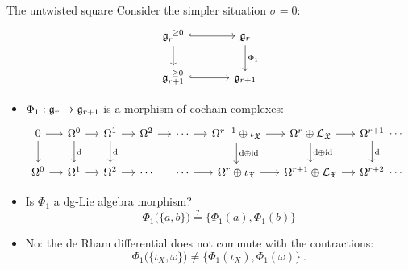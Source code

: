 \documentclass[beamer,10pt]{standalone}
\begin{document}
\begin{frame}{The untwisted square}
	Consider the simpler situation $\sigma=0$:
	\begin{displaymath}
		\begin{tikzcd}[ampersand replacement=\&, column sep = large]
			\g_{r}^{~\geq 0} \ar[r,hook] \ar[d, ]
			\& \g_{r} \ar[d,"\Phi_1"]
			\\
			\g_{r+1}^{~\geq 0} \ar[r,hook] \& \g_{r+1}
		\end{tikzcd}
	\end{displaymath}
	\vfill \pause

	\begin{itemize}[<+-|@alert@+>]
		\item $\Phi_1:\mathfrak{g}_{r}\to \mathfrak{g}_{r+1}$ is a morphism of cochain complexes:
		\begin{displaymath}
		\resizebox{\textwidth}{!}{$
		\begin{tikzcd}[ampersand replacement=\&, column sep = small]
			0\ar[r]\ar[d] \&
			\Omega^0 \ar[r] \ar[d,"\d"] \&
			\Omega^1 \ar[r] \ar[d,"\d"] \&
			\Omega^2 \ar[r] \&
			\cdots \ar[r] \&
			\Omega^{r-1}\oplus \iota_{\X} \ar[d,"\d\oplus \id"] \ar[r] \&
			\Omega^{r}\oplus \Lie_{\X} \ar[r]\ar[d,"\d\oplus\id"] \&
			\Omega^{r+1} \ar[d,"\d"] \ar[r,phantom,"\cdots"] \& \phantom{.}
			\\
			\Omega^{0} \ar[r] \&
			\Omega^{1} \ar[r] \&
			\Omega^{2} \ar[r] \&
			\cdots \& \cdots \ar[r] \&
			\Omega^{r}\oplus\iota_{\X} \ar[r] \&
			\Omega^{r+1}\oplus \Lie_{\X} \ar[r] \&
			\Omega^{r+2} \ar[r,phantom,"\cdots"]  \& \phantom{.}
		\end{tikzcd}
		$}
		\end{displaymath}
		\vfill

		\item Is $\Phi_1$ a dg-Lie algebra morphism?
			$$ \Phi_1\big(\lbrace a, b \rbrace\big) \overset{?}{=} \big\lbrace \Phi_1(a), \Phi_1(b) \big\rbrace$$
		\vfill

		\item 	No: the de Rham differential does not commute with the contractions:
		$$ \Phi_1\big(\lbrace \iota_X, \omega \rbrace\big) \neq \big\lbrace \Phi_1(\iota_X), \Phi_1(\omega)\big\rbrace~.$$
	\end{itemize}
\end{frame}
\note[itemize]
{
	\item  
	\item 
}
\end{document}
